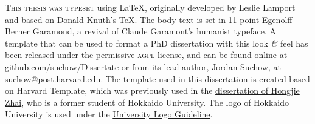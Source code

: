 \newpage



\begin{center}
    \parbox{400pt}{\lettrine[lines=3,slope=-2pt,nindent=-4pt]{\textcolor{SchoolColor}{T}}{his thesis was typeset} using \LaTeX, originally developed by Leslie Lamport and based on Donald Knuth's \TeX. The body text is set in 11 point Egenolff-Berner Garamond, a revival of Claude Garamont's humanist typeface. A template that can be used to format a PhD dissertation with this look \textit{\&} feel has been released under the permissive \textsc{agpl} license, and can be found online at \href{https://github.com/suchow/Dissertate}{github.com/suchow/Dissertate} or from its lead author, Jordan Suchow, at \href{mailto:suchow@post.harvard.edu}{suchow@post.harvard.edu}. The template used in this dissertation is created based on Harvard Template, which was previously used in the \href{https://eprints.lib.hokudai.ac.jp/dspace/bitstream/2115/70225/1/Zhai_HongJie.pdf}{dissertation of Hongjie Zhai}, who is a former student of Hokkaido University. The logo of Hokkaido University is used under the \href{https://www.hokudai.ac.jp/introduction/information/symbol/}{University Logo Guideline}.}
\end{center}
